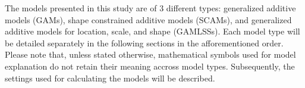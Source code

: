 The models presented in this study are of 3 different types: generalized additive models (GAMs), shape constrained additive models (SCAMs), and generalized additive models for location, scale, and shape (GAMLSSs).  Each model type will be detailed separately in the following sections in the afforementioned order.  Please note that, unless stated otherwise, mathematical symbols used for model explanation do not retain their meaning accross model types.  Subsequently, the settings used for calculating the models will be described.

